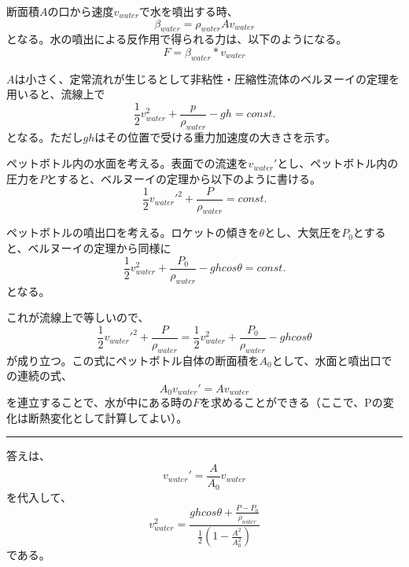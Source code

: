 \documentclass{article}
\begin{document}
断面積$A$の口から速度$v_{water}$で水を噴出する時、
\begin{equation}
\beta_{water} = \rho_{water} A v_{water}
\end{equation}
となる。水の噴出による反作用で得られる力は、以下のようになる。
\begin{equation}
F = \beta_{water} * v_{water}
\end{equation}

$A$は小さく、定常流れが生じるとして非粘性・圧縮性流体のベルヌーイの定理を用いると、流線上で
\begin{equation}
\frac{1}{2} v_{water}^2 + \frac{p}{\rho_{water}} - g h = const.
\end{equation}
となる。ただし$g h$はその位置で受ける重力加速度の大きさを示す。

ペットボトル内の水面を考える。表面での流速を$v_{water}'$とし、ペットボトル内の圧力を$P$とすると、ベルヌーイの定理から以下のように書ける。
\begin{equation}
\frac{1}{2} v_{water}'^2 + \frac{P}{\rho_{water}} = const.
\end{equation}

ペットボトルの噴出口を考える。ロケットの傾きを$\theta$とし、大気圧を$P_0$とすると、ベルヌーイの定理から同様に
\begin{equation}
\frac{1}{2} v_{water}^2 + \frac{P_0}{\rho_{water}} - g h cos \theta = const.
\end{equation}
となる。

これが流線上で等しいので、
\begin{equation}
\frac{1}{2} v_{water}'^2 + \frac{P}{\rho_{water}} = \frac{1}{2} v_{water}^2 + \frac{P_0}{\rho_{water}} - g h cos \theta
\end{equation}
が成り立つ。この式にペットボトル自体の断面積を$A_0$として、水面と噴出口での連続の式、
\begin{equation}
A_0 v_{water}' = A v_{water}
\end{equation}
を連立することで、水が中にある時の$F$を求めることができる（ここで、Pの変化は断熱変化として計算してよい）。

\vspace{3mm}
\hrule
\vspace{3mm}

答えは、
\begin{equation}
v_{water}' = \frac{A}{A_0} v_{water}
\end{equation}
を代入して、
\begin{equation}
v_{water}^2 =\frac{ g h cos \theta + \frac{P -P_0}{\rho_{water}} } {\frac{1}{2}\left( 1 - \frac{A^2}{A_0^2} \right) }
\end{equation}
である。
\end{document}
